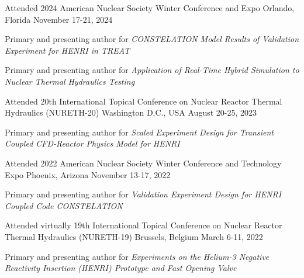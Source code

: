 \begin{cventries}


    \cventry
    {Attended} %
    {2024 American Nuclear Society Winter Conference and Expo} %
    {Orlando, Florida} %
    {November 17-21, 2024} %
    {
    \begin{cvitems}
        \item{Primary and presenting author for \textit{CONSTELATION Model Results of Validation Experiment for HENRI in TREAT}}
        \item{Primary and presenting author for \textit{Application of Real-Time Hybrid Simulation to Nuclear Thermal Hydraulics Testing}}
    \end{cvitems}
    }

    \cventry
    {Attended} %
    {20th International Topical Conference on Nuclear Reactor Thermal Hydraulics (NURETH-20)} %
    {Washington D.C., USA} %
    {August 20-25, 2023} %
    {
    \begin{cvitems}
        \item{Primary and presenting author for \textit{Scaled Experiment Design for Transient Coupled CFD-Reactor Physics Model for HENRI}}
    \end{cvitems}
    }


    \cventry
    {Attended} %
    {2022 American Nuclear Society Winter Conference and Technology Expo} %
    {Phoenix, Arizona} %
    {November 13-17, 2022} %
    {
    \begin{cvitems}
        \item{Primary and presenting author for \textit{Validation Experiment Design for HENRI Coupled Code CONSTELATION}}
    \end{cvitems}
    }

    \cventry
    {Attended virtually} %
    {19th International Topical Conference on Nuclear Reactor Thermal Hydraulics (NURETH-19)} %
    {Brussels, Belgium} %
    {March 6-11, 2022} %
    {
    \begin{cvitems}
        \item{Primary and presenting author for \textit{Experiments on the Helium-3 Negative Reactivity Insertion (HENRI) Prototype and Fast Opening Valve}}
    \end{cvitems}
    }


\end{cventries}
